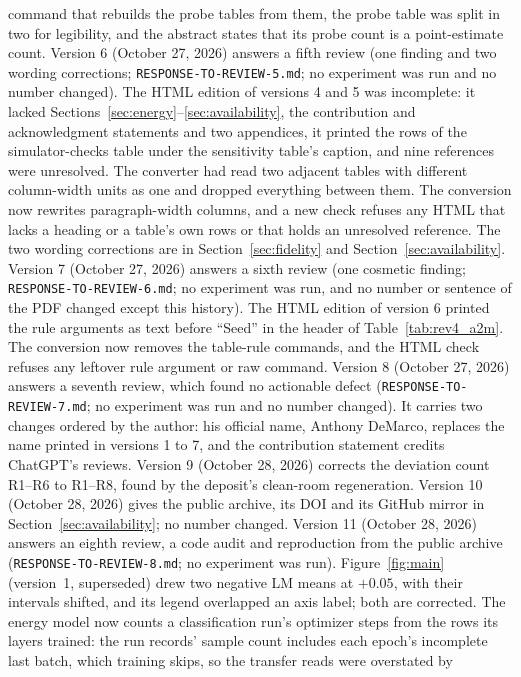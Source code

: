 command that rebuilds the probe tables from them, the probe table was split in two for legibility, and the abstract
states that its probe count is a point-estimate count. Version 6 (October 27, 2026) answers a fifth review
(one finding and two wording corrections; \texttt{RESPONSE-TO-REVIEW-5.md}; no experiment was run and no number
changed). The HTML edition of versions 4 and 5 was incomplete: it lacked Sections~\ref{sec:energy}--\ref{sec:availability}, the
contribution and acknowledgment statements and two appendices, it printed the rows of the simulator-checks table under the
sensitivity table's caption, and nine references were unresolved. The converter had read two adjacent tables with
different column-width units as one and dropped everything between them. The conversion now rewrites paragraph-width
columns, and a new check refuses any HTML that lacks a heading or a table's own rows or that holds an unresolved reference. The
two wording corrections are in Section~\ref{sec:fidelity} and Section~\ref{sec:availability}. Version 7 (October 27, 2026)
answers a sixth review (one cosmetic finding; \texttt{RESPONSE-TO-REVIEW-6.md}; no experiment was run, and no
number or sentence of the PDF changed except this history). The HTML edition of version 6 printed the rule arguments
as text before ``Seed'' in the header of Table~\ref{tab:rev4_a2m}. The conversion now removes the table-rule
commands, and the HTML check refuses any leftover rule argument or raw command. Version 8 (October 27, 2026) answers a
seventh review, which found no actionable defect (\texttt{RESPONSE-TO-REVIEW-7.md}; no experiment was run and no number
changed). It carries two changes ordered by the author: his official name, Anthony DeMarco, replaces the name printed in versions 1 to 7,
and the contribution statement credits ChatGPT's reviews. Version 9 (October 28, 2026) corrects the deviation count R1--R6 to R1--R8, found by the deposit's clean-room regeneration.
Version 10 (October 28, 2026) gives the public archive, its DOI and its GitHub mirror in Section~\ref{sec:availability}; no number changed.
Version 11 (October 28, 2026) answers an eighth review, a code audit and reproduction from the public archive
(\texttt{RESPONSE-TO-REVIEW-8.md}; no experiment was run). Figure~\ref{fig:main} (version~1, superseded) drew two negative
LM means at $+0.05$, with their intervals shifted, and its legend overlapped an axis label; both are corrected. The
energy model now counts a classification run's optimizer steps from the rows its layers trained: the run records' sample
count includes each epoch's incomplete last batch, which training skips, so the transfer reads were overstated by
